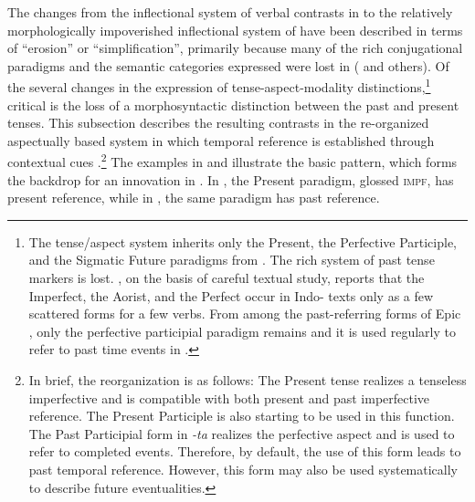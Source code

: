 \documentclass[output=paper,hidelinks]{langscibook}
\begin{document}
\begin{exe}
\begin{xlist}
\begin{xlist}
\begin{exe}
\begin{exe}
\begin{exe}
\begin{exe}
\begin{xlist}
\begin{exe}
\begin{xlist}
The changes from the inflectional system of verbal contrasts in  to the relatively morphologically impoverished inflectional system of  have been described in terms of ``erosion'' or ``simplification'', primarily because many of the rich conjugational paradigms and the semantic categories
 expressed were lost in  (\citealt{bloch65, beames66, bubenik98, bubenik96, pischel00, vale48, masica91} and
others). Of the several changes in the expression of tense-aspect-modality distinctions,\footnote{The  tense/aspect system inherits only the Present, the Perfective Participle, and the Sigmatic Future
paradigms from . The rich system of past tense markers is lost. \citet{pischel00}, on the
basis of careful textual study, reports that the Imperfect, the Aorist, and the Perfect occur in  Indo-
 texts only as a few scattered forms for a few verbs. From among the past-referring forms of Epic
, only the perfective participial paradigm remains and it is used regularly to refer to past time events in .} critical is the loss of a morphosyntactic distinction between the past and present tenses. This subsection describes the resulting contrasts in the re-organized aspectually based system in which temporal reference is established through contextual cues \citep{deo2012}.\footnote{In brief, the reorganization is as follows: The  Present tense realizes a tenseless imperfective and is compatible with both present and past imperfective reference. The  Present Participle is also starting to be used in this function. The  Past Participial form in \emph{-ta} realizes the perfective aspect and is used to refer to completed events. Therefore, by default, the use of this form leads to past temporal reference. However, this form may also be used systematically to describe future eventualities.} The examples in  and  illustrate the basic  pattern, which forms the backdrop for an innovation in . In , the  Present paradigm, glossed \textsc{impf}, has present reference, while in , the same paradigm has past reference.



\end{xlist}
\end{exe}
\end{xlist}
\end{exe}
\end{exe}
\end{exe}
\end{exe}
\end{xlist}
\end{xlist}
\end{exe}
\end{document}
